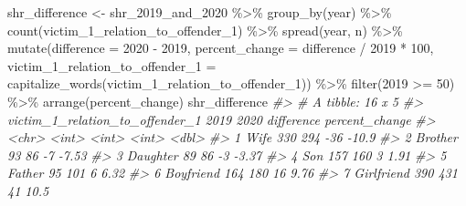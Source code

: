 \documentclass[
]{krantz}
\makeatletter
\newenvironment{Shaded}{\begin{snugshade}}{\end{snugshade}}
\newcommand{\AttributeTok}[1]{\textcolor[rgb]{0.61,0.61,0.61}{#1}}
\newcommand{\CommentTok}[1]{\textcolor[rgb]{0.37,0.37,0.37}{\textit{#1}}}
\newcommand{\DecValTok}[1]{\textcolor[rgb]{0.06,0.06,0.06}{#1}}
\newcommand{\FunctionTok}[1]{\textcolor[rgb]{0,0,0}{#1}}
\newcommand{\NormalTok}[1]{#1}
\newcommand{\OtherTok}[1]{\textcolor[rgb]{0.37,0.37,0.37}{#1}}
\newcommand{\SpecialCharTok}[1]{\textcolor[rgb]{0,0,0}{#1}}
\newcommand{\StringTok}[1]{\textcolor[rgb]{0.5,0.5,0.5}{#1}}
\newenvironment{kframe}{%
\medskip{}
\setlength{\fboxsep}{.8em}
 \def\at@end@of@kframe{}%
 \ifinner\ifhmode%
  \def\at@end@of@kframe{\end{minipage}}%
  \begin{minipage}{\columnwidth}%
 \fi\fi%
 \def\FrameCommand##1{\hskip\@totalleftmargin \hskip-\fboxsep
 \colorbox{shadecolor}{##1}\hskip-\fboxsep
     \hskip-\linewidth \hskip-\@totalleftmargin \hskip\columnwidth}%
 \MakeFramed {\advance\hsize-\width
   \@totalleftmargin\z@ \linewidth\hsize
   \@setminipage}}%
 {\par\unskip\endMakeFramed%
 \at@end@of@kframe}
\renewenvironment{Shaded}{\begin{kframe}}{\end{kframe}}
\makeatother
\begin{document}
\begin{Shaded}
\begin{Highlighting}[]
\NormalTok{shr\_difference }\OtherTok{\textless{}{-}} 
\NormalTok{  shr\_2019\_and\_2020 }\SpecialCharTok{\%\textgreater{}\%}
  \FunctionTok{group\_by}\NormalTok{(year) }\SpecialCharTok{\%\textgreater{}\%}
  \FunctionTok{count}\NormalTok{(victim\_1\_relation\_to\_offender\_1) }\SpecialCharTok{\%\textgreater{}\%}
  \FunctionTok{spread}\NormalTok{(year, n) }\SpecialCharTok{\%\textgreater{}\%}
  \FunctionTok{mutate}\NormalTok{(}\AttributeTok{difference =} \StringTok{\textasciigrave{}}\AttributeTok{2020}\StringTok{\textasciigrave{}} \SpecialCharTok{{-}} \StringTok{\textasciigrave{}}\AttributeTok{2019}\StringTok{\textasciigrave{}}\NormalTok{,}
         \AttributeTok{percent\_change =}\NormalTok{ difference }\SpecialCharTok{/} \StringTok{\textasciigrave{}}\AttributeTok{2019}\StringTok{\textasciigrave{}} \SpecialCharTok{*} \DecValTok{100}\NormalTok{,}
         \AttributeTok{victim\_1\_relation\_to\_offender\_1 =} \FunctionTok{capitalize\_words}\NormalTok{(victim\_1\_relation\_to\_offender\_1)) }\SpecialCharTok{\%\textgreater{}\%}
  \FunctionTok{filter}\NormalTok{(}\StringTok{\textasciigrave{}}\AttributeTok{2019}\StringTok{\textasciigrave{}} \SpecialCharTok{\textgreater{}=} \DecValTok{50}\NormalTok{) }\SpecialCharTok{\%\textgreater{}\%}
  \FunctionTok{arrange}\NormalTok{(percent\_change)}
\NormalTok{shr\_difference}
\CommentTok{\#\textgreater{} \# A tibble: 16 x 5}
\CommentTok{\#\textgreater{}    victim\_1\_relation\_to\_offender\_1 \textasciigrave{}2019\textasciigrave{} \textasciigrave{}2020\textasciigrave{} difference percent\_change}
\CommentTok{\#\textgreater{}    \textless{}chr\textgreater{}                            \textless{}int\textgreater{}  \textless{}int\textgreater{}      \textless{}int\textgreater{}          \textless{}dbl\textgreater{}}
\CommentTok{\#\textgreater{}  1 Wife                               330    294        {-}36         {-}10.9 }
\CommentTok{\#\textgreater{}  2 Brother                             93     86         {-}7          {-}7.53}
\CommentTok{\#\textgreater{}  3 Daughter                            89     86         {-}3          {-}3.37}
\CommentTok{\#\textgreater{}  4 Son                                157    160          3           1.91}
\CommentTok{\#\textgreater{}  5 Father                              95    101          6           6.32}
\CommentTok{\#\textgreater{}  6 Boyfriend                          164    180         16           9.76}
\CommentTok{\#\textgreater{}  7 Girlfriend                         390    431         41          10.5 }

\end{Highlighting}
\end{Shaded}
\end{document}
